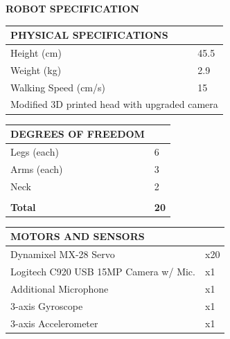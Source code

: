 \documentclass[10pt,a4paper]{article}
\begin{document}
\begin{center}
	\colorbox[rgb]{0.0, 0.0, 0.0}
	{
	\begin{minipage}[c][3em][c]{\textwidth}
		{\color{textcolour}
			{
			\begin{Large}
				\textbf{ROBOT SPECIFICATION}
			\end{Large}
			}
		}
	\end{minipage}
	}
\end{center}

\begin{multicols}{2}
\begin{table}[H]
	\begin{tabular}{|m{5.7cm}|m{1.15cm}|}
		\hline
		\rowcolor[rgb]{0.0, 0.0, 0.0}
		{\color{textcolour}\textbf{{PHYSICAL SPECIFICATIONS}}} & \\
		\hline
		Height (cm) & 45.5 \\
		\hline
		Weight (kg) & 2.9 \\
		\hline
		Walking Speed (cm/s) & 15 \\
		\hline
		\multicolumn{2}{|l|}{Modified 3D printed head with upgraded camera} \\
		\hline
	\end{tabular}
\end{table}

\begin{table}[H]
	\begin{tabular}{|m{5.7cm}|m{1.15cm}|}
		\hline
		\rowcolor[rgb]{0.0, 0.0, 0.0}
		{\color{textcolour}\textbf{{DEGREES OF FREEDOM}}} & \\
		\hline
		Legs (each) & 6 \\
		\hline
		Arms (each) & 3 \\
		\hline
		Neck & 2 \\
		\hline
		& \\
		\hline
		\textbf{Total} & \textbf{20} \\
		\hline
	\end{tabular}
\end{table}

\begin{table}[H]
	\begin{tabular}{|m{5.7cm}|m{1.15cm}|}
		\hline
		\rowcolor[rgb]{0.0, 0.0, 0.0}
		{\color{textcolour}\textbf{{MOTORS AND SENSORS}}} & \\
		\hline
		Dynamixel MX-28 Servo & x20 \\
		\hline
		Logitech C920 USB 15MP Camera w/ Mic. & x1 \\
		\hline
		Additional Microphone & x1 \\
		\hline
		3-axis Gyroscope & x1 \\
		\hline
		3-axis Accelerometer & x1 \\
		\hline
	\end{tabular}
\end{table}


\end{multicols}
\end{document}
